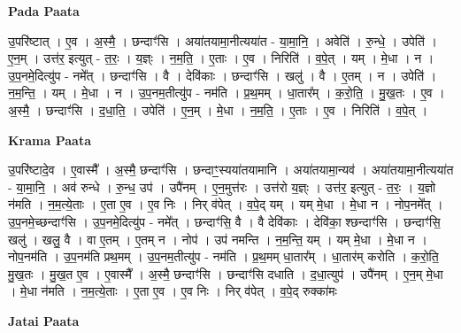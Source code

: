 \documentclass[17pt]{extarticle}
\begin{document}
\textbf{Pada Paata} \newline

उ॒परि॑ष्टात् । ए॒व । अ॒स्मै॒ । छन्दाꣳ॑सि । अया॑तयामा॒नीत्यया॑त - या॒मा॒नि॒ । अवेति॑ । रु॒न्धे॒ । उपेति॑ । ए॒न॒म् । उत्त॑र॒ इत्युत् - त॒रः॒ । य॒ज्ञ्ः । न॒म॒ति॒ । ए॒ताः । ए॒व । निरिति॑ । व॒पे॒त् । यम् । मे॒धा । न । उ॒प॒नमे॒दित्यु॑प - नमे᳚त् । छन्दाꣳ॑सि । वै । देवि॑काः । छन्दाꣳ॑सि । खलु॑ । वै । ए॒तम् । न । उपेति॑ । न॒म॒न्ति॒ । यम् । मे॒धा । न । उ॒प॒नम॒तीत्यु॑प - नम॑ति । प्र॒थ॒मम् । धा॒तार᳚म् । क॒रो॒ति॒ । मु॒ख॒तः । ए॒व । अ॒स्मै॒ । छन्दाꣳ॑सि । द॒धा॒ति॒ । उपेति॑ । ए॒न॒म् । मे॒धा । न॒म॒ति॒ । ए॒ताः । ए॒व । निरिति॑ । व॒पे॒त् ।  \newline


\textbf{Krama Paata} \newline

उ॒परि॑ष्टादे॒व । ए॒वास्मै᳚ । अ॒स्मै॒ छन्दाꣳ॑सि । छन्दाꣳ॒॒स्यया॑तयामानि । अया॑तयामा॒न्यव॑ । अया॑तयामा॒नीत्यया॑त - या॒मा॒नि॒ । अव॑ रुन्धे । रु॒न्ध॒ उप॑ । उपै॑नम् । ए॒न॒मुत्त॑रः । उत्त॑रो य॒ज्ञ्ः । उत्त॑र॒ इत्युत् - त॒रः॒ । य॒ज्ञो न॑मति । न॒म॒त्ये॒ताः । ए॒ता ए॒व । ए॒व निः । निर् व॑पेत् । व॒पे॒द् यम् । यम् मे॒धा । मे॒धा न । नोप॒नमे᳚त् । उ॒प॒नमे॒च्छन्दाꣳ॑सि । उ॒प॒नमे॒दित्यु॑प - नमे᳚त् । छन्दाꣳ॑सि॒ वै । वै देवि॑काः । देवि॑का॒ श्छन्दाꣳ॑सि । छन्दाꣳ॑सि॒ खलु॑ । खलु॒ वै । वा ए॒तम् । ए॒तम् न । नोप॑ । उप॑ नमन्ति । न॒म॒न्ति॒ यम् । यम् मे॒धा । मे॒धा न । नोप॒नम॑ति । उ॒प॒नम॑ति प्रथ॒मम् । उ॒प॒नम॒तीत्यु॑प - नम॑ति । प्र॒थ॒मम् धा॒तार᳚म् । धा॒तार॑म् करोति । क॒रो॒ति॒ मु॒ख॒तः । मु॒ख॒त ए॒व । ए॒वास्मै᳚ । अ॒स्मै॒ छन्दाꣳ॑सि । छन्दाꣳ॑सि दधाति । द॒धा॒त्युप॑ । उपै॑नम् । ए॒न॒म् मे॒धा । मे॒धा न॑मति । न॒म॒त्ये॒ताः । ए॒ता ए॒व । ए॒व निः । निर् व॑पेत् । व॒पे॒द् रुक्का॑मः \newline

\textbf{Jatai Paata} \newline
\end{document}
